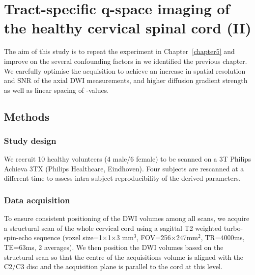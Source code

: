 \chapter{Tract-specific q-space imaging of the healthy cervical spinal cord (II)}
\label{chapter6}
The aim of this study is to repeat the experiment in Chapter~\ref{chapter5} and improve on the several confounding factors in we identified the previous chapter. We carefully optimise the acquisition to achieve an increase in spatial resolution and \gls{SNR} of the axial \gls{DWI} measurements, and higher diffusion gradient strength as well as linear spacing of {\q}-values.

\section{Methods}
\subsection{Study design}
We recruit 10 healthy volunteers (4 male/6 female) to be scanned on a 3T Philips Achieva 3TX (Philips Healthcare, Eindhoven). Four subjects are rescanned at a different time to assess intra-subject reproducibility of the derived parameters.
\subsection{Data acquisition}
To ensure consistent positioning of the \gls{DWI} volumes among all scans, we acquire a structural scan of the whole cervical cord using a sagittal T2 weighted turbo-spin-echo sequence (voxel size=1$\times$1$\times$3 mm$^3$, FOV=256$\times$247mm$^2$, TR=4000ms, TE=63ms, 2 averages). We then position the \gls{DWI} volumes based on the structural scan so that the centre of the acquisitions volume is aligned with the C2/C3 disc and the acquisition plane is parallel to the cord at this level.

